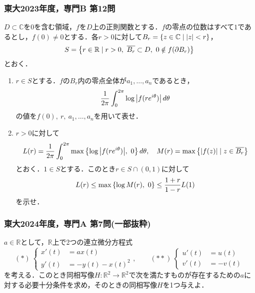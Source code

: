 \documentclass[a4j]{ltjsarticle}
\newcommand{\Rset}{\mathbb{R}}
\newcommand{\Cset}{\mathbb{C}}
\newcommand{\1}{\mathbbm{1}}
\numberwithin{equation}{section}
\theoremstyle{definition}
\begin{document}
\subsubsection*{東大2023年度，専門B 第12問}
$D\subset \Cset$を$0$を含む領域，$f$を$D$上の正則関数とする．$f$の零点の位数はすべて$1$であるとし，$f(0)\neq0$とする．各$r>0$に対して$B_r=\qty{z\in\Cset\mid \abs{z}<r}$，
\begin{equation}
    S=\qty{r\in\Rset\mid r>0,\ \overline{B_r}\subset D,\ 0\notin f(\partial B_r)}
\end{equation}
とおく．
\begin{enumerate}
    \item $r\in S$とする．$f$の$B_r$内の零点全体が$a_1,\ldots,a_n$であるとき，
    \begin{equation}
        \frac{1}{2\pi}\int_{0}^{2\pi}\log\abs{f(re^{i\theta})}\,d\theta 
    \end{equation}
    の値を$f(0),\ r,\ a_1,\ldots,a_n$を用いて表せ．
    \item $r>0$に対して
    \begin{equation}
        L(r)=\frac{1}{2\pi}\int_{0}^{2\pi}\max\qty{\log\abs{f(re^{i\theta})},\ 0}\,d\theta,\quad M(r)=\max\qty{\abs{f(z)}\mid z\in \overline{B_r}}
    \end{equation}
    とおく．$1\in S$とする．このとき$r\in S\cap (0,1)$に対して
    \begin{equation}
        L(r)\leq \max\qty{\log M(r),\ 0}\leq \frac{1+r}{1-r}L(1)
    \end{equation}
    を示せ．
\end{enumerate}
\subsubsection*{東大2024年度，専門A 第7問(一部抜粋)}
$a\in\Rset$として，$\Rset$上で2つの連立微分方程式
\begin{equation}
    (\ast)\ \left\{ 
        \begin{alignedat}{2}   
          x'(t) &= ax(t)\\   
          y'(t) &= -y(t)-x(t)^2 
        \end{alignedat} 
        \right.,\quad \quad (\ast\ast)\ \left\{ 
            \begin{alignedat}{2}   
              u'(t) &= u(t)\\   
              v'(t) &= -v(t) 
            \end{alignedat} 
            \right.
\end{equation}
を考える．このとき同相写像$H\colon \Rset^2\to \Rset^2$で次を満たすものが存在するための$a$に対する必要十分条件を求め，そのときの同相写像$H$を1つ与えよ．
\end{document}
